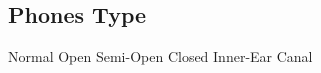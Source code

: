 \subsection{Phones Type}









































Normal
Open
Semi-Open
Closed
Inner-Ear
Canal
